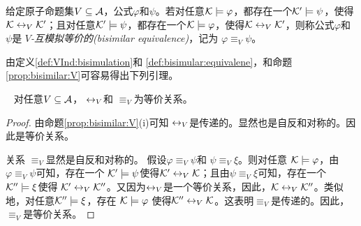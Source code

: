 \begin{definition}\label{def:bisimular:equivalene}
	给定原子命题集$V\subseteq {\cal A}$，公式$\varphi$和$\psi$。若对任意${\cal K}\models \varphi$，都存在一个${\cal K}'\models\psi$，使得${\cal K}\leftrightarrow_V{\cal K}'$；且对任意${\cal K}'\models\psi$，都存在一个${\cal K}\models \varphi$，使得${\cal K}\leftrightarrow_V{\cal K}'$，则称公式$\varphi$和 $\psi$是 {\em $V$-互模拟等价的(bisimilar equivalence)}，记为 $\varphi\equiv_V\psi$。
\end{definition}

由定义\ref{def:VInd:bisimulation}和 \ref{def:bisimular:equivalene}，和命题\ref{prop:bisimilar:V}可容易得出下列引理。
\begin{lemma}~\label{lem:eqR}
	对任意$V\subseteq\cal A$，  $\leftrightarrow_V$和 $\equiv_V$为等价关系。
\end{lemma}
\begin{proof}
	由命题\ref{prop:bisimilar:V}(i)可知 $\leftrightarrow_V$是传递的。显然也是自反和对称的。因此是等价关系。
	
	关系 $\equiv_V$显然是自反和对称的。
	假设$\varphi\equiv_V\psi$和 $\psi\equiv_V\xi$。则对任意 ${\cal K}\models\varphi$，由$\varphi\equiv_V\psi$可知，存在一个 ${\cal K}'\models\psi$使得${\cal K}'\leftrightarrow_V{\cal K}$；且由$\psi\equiv_V\xi$可知，存在一个 ${\cal K}''\models\xi$使得
	${\cal K}'\leftrightarrow_V{\cal K}''$。又因为$\leftrightarrow_V$是一个等价关系，因此，${\cal K}\leftrightarrow_V{\cal K}''$。类似地，对任意${\cal K}''\models\xi$，存在 ${\cal K}\models \varphi$ 使得${\cal K}''\leftrightarrow_V{\cal K}$。这表明$\equiv_V$是传递的。因此，$\equiv_V$是等价关系。
\end{proof} 

